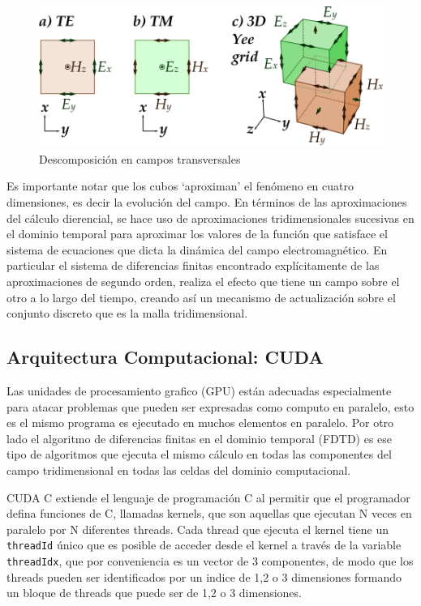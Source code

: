 \documentclass[]{article}
\begin{document}
\begin{figure}
\centering
\includegraphics{img/yee_2d_3d.png}
\caption{Descomposición en campos transversales}
\end{figure}

Es importante notar que los cubos `aproximan' el fenómeno en cuatro
dimensiones, es decir la evolución del campo. En términos de las
aproximaciones del cálculo dierencial, se hace uso de aproximaciones
tridimensionales sucesivas en el dominio temporal para aproximar los
valores de la función que satisface el sistema de ecuaciones que dicta
la dinámica del campo electromagnético. En particular el sistema de
diferencias finitas encontrado explícitamente de las aproximaciones de
segundo orden, realiza el efecto que tiene un campo sobre el otro a lo
largo del tiempo, creando así un mecanismo de actualización sobre el
conjunto discreto que es la malla tridimensional.

\subsection{Arquitectura Computacional:
CUDA}\label{arquitectura-computacional-cuda}

Las unidades de procesamiento grafico (GPU) están adecuadas
especialmente para atacar problemas que pueden ser expresadas como
computo en paralelo, esto es el mismo programa es ejecutado en muchos
elementos en paralelo. Por otro lado el algoritmo de diferencias finitas
en el dominio temporal (FDTD) es ese tipo de algoritmos que ejecuta el
mismo cálculo en todas las componentes del campo tridimensional en todas
las celdas del dominio computacional.

CUDA C extiende el lenguaje de programación C al permitir que el
programador defina funciones de C, llamadas kernels, que son aquellas
que ejecutan N veces en paralelo por N diferentes threads. Cada thread
que ejecuta el kernel tiene un \texttt{threadId} único que es posible de
acceder desde el kernel a través de la variable \texttt{threadIdx}, que
por conveniencia es un vector de 3 componentes, de modo que los threads
pueden ser identificados por un indice de 1,2 o 3 dimensiones formando
un bloque de threads que puede ser de 1,2 o 3 dimensiones.
\end{document}
